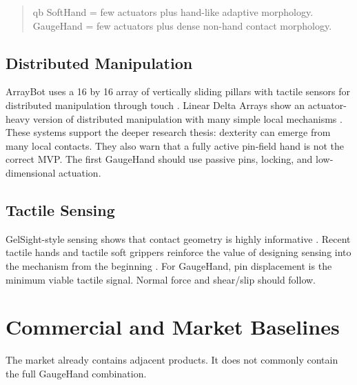 \documentclass[11pt]{article}
\newcommand{\GaugeHand}{GaugeHand}
\begin{document}
\begin{quote}
qb SoftHand = few actuators plus hand-like adaptive morphology. \\
\GaugeHand{} = few actuators plus dense non-hand contact morphology.
\end{quote}

\subsection{Distributed Manipulation}

ArrayBot uses a 16 by 16 array of vertically sliding pillars with tactile sensors for distributed manipulation through touch \cite{arraybot}. Linear Delta Arrays show an actuator-heavy version of distributed manipulation with many simple local mechanisms \cite{linearDelta}. These systems support the deeper research thesis: dexterity can emerge from many local contacts. They also warn that a fully active pin-field hand is not the correct MVP. The first \GaugeHand{} should use passive pins, locking, and low-dimensional actuation.

\subsection{Tactile Sensing}

GelSight-style sensing shows that contact geometry is highly informative \cite{gelsight}. Recent tactile hands and tactile soft grippers reinforce the value of designing sensing into the mechanism from the beginning \cite{ftac,alltact}. For \GaugeHand{}, pin displacement is the minimum viable tactile signal. Normal force and shear/slip should follow.

\section{Commercial and Market Baselines}

The market already contains adjacent products. It does not commonly contain the full \GaugeHand{} combination.
\end{document}

